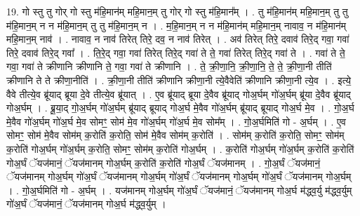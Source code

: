 \documentclass[17pt]{extarticle}
\begin{document}
19. गो स्तु तु गोर् गो स्तु म॑हि॒मान॑म् महि॒मान॒म् तु गोर् गो स्तु म॑हि॒मान᳚म् । . तु म॑हि॒मान॑म् महि॒मान॒म् तु तु म॑हि॒मान॒म् न न म॑हि॒मान॒म् तु तु म॑हि॒मान॒म् न । . म॒हि॒मान॒म् न न म॑हि॒मान॑म् महि॒मान॒म् नावाव॒ न म॑हि॒मान॑म् महि॒मान॒म् नाव॑ । . नावाव॒ न नाव॑ तिरेत् तिरे॒ दव॒ न नाव॑ तिरेत् । . अव॑ तिरेत् तिरे॒ दवाव॑ तिरे॒द् गवा॒ गवा॑ तिरे॒ दवाव॑ तिरे॒द् गवा᳚ । . ति॒रे॒द् गवा॒ गवा॑ तिरेत् तिरे॒द् गवा॑ ते ते॒ गवा॑ तिरेत् तिरे॒द् गवा॑ ते । . गवा॑ ते ते॒ गवा॒ गवा॑ ते क्रीणानि क्रीणानि ते॒ गवा॒ गवा॑ ते क्रीणानि । . ते॒ क्री॒णा॒नि॒ क्री॒णा॒नि॒ ते॒ ते॒ क्री॒णा॒नी तीति॑ क्रीणानि ते ते क्रीणा॒नीति॑ । . क्री॒णा॒नी तीति॑ क्रीणानि क्रीणा॒नी त्ये॒वैवेति॑ क्रीणानि क्रीणा॒नी त्ये॒व । . इत्ये॒ वैवे तीत्ये॒व ब्रू॑याद् ब्रूया दे॒वे तीत्ये॒व ब्रू॑यात् । . ए॒व ब्रू॑याद् ब्रूया दे॒वैव ब्रू॑याद् गोअ॒र्घम् गो॑अ॒र्घम् ब्रू॑या दे॒वैव ब्रू॑याद् गोअ॒र्घम् । . ब्रू॒या॒द् गो॒अ॒र्घम् गो॑अ॒र्घम् ब्रू॑याद् ब्रूयाद् गोअ॒र्घ मे॒वैव गो॑अ॒र्घम् ब्रू॑याद् ब्रूयाद् गोअ॒र्घ मे॒व । . गो॒अ॒र्घ मे॒वैव गो॑अ॒र्घम् गो॑अ॒र्घ मे॒व सोमꣳ॒॒ सोम॑ मे॒व गो॑अ॒र्घम् गो॑अ॒र्घ मे॒व सोम᳚म् । . गो॒अ॒र्घमिति॑ गो - अ॒र्घम् । . ए॒व सोमꣳ॒॒ सोम॑ मे॒वैव सोम॑म् क॒रोति॑ क॒रोति॒ सोम॑ मे॒वैव सोम॑म् क॒रोति॑ । . सोम॑म् क॒रोति॑ क॒रोति॒ सोमꣳ॒॒ सोम॑म् क॒रोति॑ गोअ॒र्घम् गो॑अ॒र्घम् क॒रोति॒ सोमꣳ॒॒ सोम॑म् क॒रोति॑ गोअ॒र्घम् । . क॒रोति॑ गोअ॒र्घम् गो॑अ॒र्घम् क॒रोति॑ क॒रोति॑ गोअ॒र्घं ॅयज॑मानं॒ ॅयज॑मानम् गोअ॒र्घम् क॒रोति॑ क॒रोति॑ गोअ॒र्घं ॅयज॑मानम् । . गो॒अ॒र्घं ॅयज॑मानं॒ ॅयज॑मानम् गोअ॒र्घम् गो॑अ॒र्घं ॅयज॑मानम् गोअ॒र्घम् गो॑अ॒र्घं ॅयज॑मानम् गोअ॒र्घम् गो॑अ॒र्घं ॅयज॑मानम् गोअ॒र्घम् । . गो॒अ॒र्घमिति॑ गो - अ॒र्घम् । . यज॑मानम् गोअ॒र्घम् गो॑अ॒र्घं ॅयज॑मानं॒ ॅयज॑मानम् गोअ॒र्घ म॑द्ध्व॒र्यु म॑द्ध्व॒र्युम् गो॑अ॒र्घं ॅयज॑मानं॒ ॅयज॑मानम् गोअ॒र्घ म॑द्ध्व॒र्युम् । \newline
\end{document}
